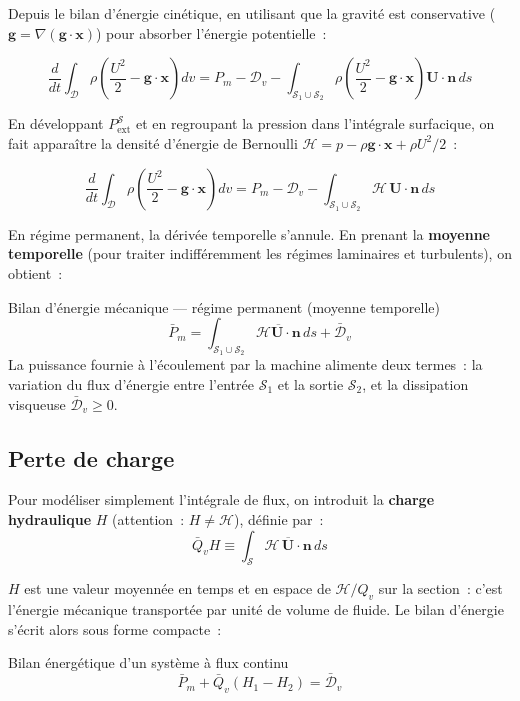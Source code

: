 \documentclass[11pt,a4paper]{report}
\begin{document}
Depuis le bilan d'énergie cinétique, en utilisant que la gravité est conservative
($\bm{g}=\nabla(\bm{g}\cdot\bm{x})$) pour absorber l'énergie potentielle~:

\[
    \frac{d}{dt}\int_{\mathcal{D}}\rho\left(\frac{U^2}{2}-\bm{g}\cdot\bm{x}\right)dv
    = P_m - \mathcal{D}_v
    - \int_{\mathcal{S}_1\cup\mathcal{S}_2}\rho\left(\frac{U^2}{2}-\bm{g}\cdot\bm{x}\right)\bm{U}\cdot\bm{n}\,ds
\]

En développant $P_\text{ext}^{\mathcal{S}}$ et en regroupant la pression dans
l'intégrale surfacique, on fait apparaître la densité d'énergie de Bernoulli
$\mathcal{H}=p-\rho\bm{g}\cdot\bm{x}+\rho U^2/2$~:

\[
    \frac{d}{dt}\int_{\mathcal{D}}\rho\left(\frac{U^2}{2}-\bm{g}\cdot\bm{x}\right)dv
    = P_m - \mathcal{D}_v
    - \int_{\mathcal{S}_1\cup\mathcal{S}_2}\mathcal{H}\,\bm{U}\cdot\bm{n}\,ds
\]

En régime permanent, la dérivée temporelle s'annule. En prenant la
\textbf{moyenne temporelle} (pour traiter indifféremment les régimes laminaires et
turbulents), on obtient~:

\begin{importantbox}{Bilan d'énergie mécanique --- régime permanent (moyenne temporelle)}
\[
    \bar{P}_m = \int_{\mathcal{S}_1\cup\mathcal{S}_2}\overline{\mathcal{H}\bm{U}\cdot\bm{n}}\,ds
    + \bar{\mathcal{D}}_v
\]
La puissance fournie à l'écoulement par la machine alimente deux termes~: la
variation du flux d'énergie entre l'entrée $\mathcal{S}_1$ et la sortie $\mathcal{S}_2$,
et la dissipation visqueuse $\bar{\mathcal{D}}_v \geq 0$.
\end{importantbox}

\subsection{Perte de charge}

Pour modéliser simplement l'intégrale de flux, on introduit la
\textbf{charge hydraulique} $H$ (attention~: $H \neq \mathcal{H}$), définie par~:
\[
    \bar{Q}_v H \equiv \int_{\mathcal{S}}\overline{\mathcal{H}\,\bm{U}\cdot\bm{n}}\,ds
\]

$H$ est une valeur moyennée en temps et en espace de $\mathcal{H}/Q_v$
sur la section~: c'est l'énergie mécanique transportée par unité de volume
de fluide. Le bilan d'énergie s'écrit alors sous forme compacte~:

\begin{importantbox}{Bilan énergétique d'un système à flux continu}
\[
    \bar{P}_m + \bar{Q}_v(H_1 - H_2) = \bar{\mathcal{D}}_v
    \tag{17}
\]
\end{importantbox}
\end{document}
